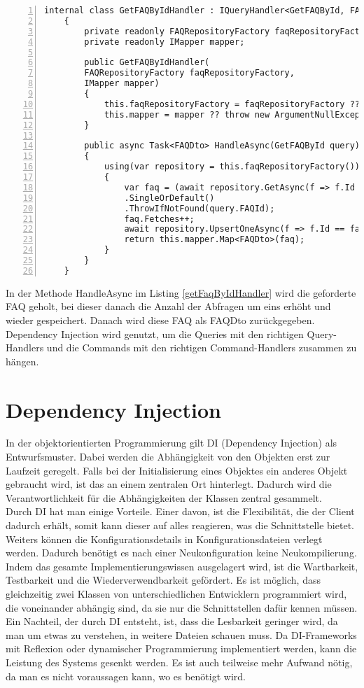 \begin{lstlisting}[caption={CQS-Handler Beispiel},captionpos=b, numbers=left, backgroundcolor=\color{black!10},language={[Sharp]C}, label={getFaqByIdHandler}]
	internal class GetFAQByIdHandler : IQueryHandler<GetFAQById, FAQDto>
	{
		private readonly FAQRepositoryFactory faqRepositoryFactory;
		private readonly IMapper mapper;
		
		public GetFAQByIdHandler(
		FAQRepositoryFactory faqRepositoryFactory,
		IMapper mapper)
		{
			this.faqRepositoryFactory = faqRepositoryFactory ?? throw new ArgumentNullException (nameof(faqRepositoryFactory));
			this.mapper = mapper ?? throw new ArgumentNullException(nameof(mapper));
		}
		
		public async Task<FAQDto> HandleAsync(GetFAQById query)
		{
			using(var repository = this.faqRepositoryFactory())
			{
				var faq = (await repository.GetAsync(f => f.Id == query.FAQId))
				.SingleOrDefault()
				.ThrowIfNotFound(query.FAQId);
				faq.Fetches++;
				await repository.UpsertOneAsync(f => f.Id == faq.Id, faq);
				return this.mapper.Map<FAQDto>(faq);
			}
		}
	}
\end{lstlisting}
In der Methode HandleAsync im Listing \ref{getFaqByIdHandler} wird die geforderte FAQ geholt, bei dieser danach die Anzahl der Abfragen um eins erhöht und wieder gespeichert. Danach wird diese FAQ als FAQDto zurückgegeben.\\
Dependency Injection wird genutzt, um die Queries mit den richtigen Query-Handlers und die Commands mit den richtigen Command-Handlers zusammen zu hängen. \autocite{cqsSOLIDeArchitektur}
\section{Dependency Injection}
In der objektorientierten Programmierung gilt DI (Dependency Injection) als Entwurfsmuster. Dabei werden die Abhängigkeit von den Objekten erst zur Laufzeit geregelt. Falls bei der Initialisierung eines Objektes ein anderes Objekt gebraucht wird, ist das an einem zentralen Ort hinterlegt. Dadurch wird die Verantwortlichkeit für die Abhängigkeiten der Klassen zentral gesammelt.\autocite{wikiDI}\\
Durch DI hat man einige Vorteile. Einer davon, ist die Flexibilität, die der Client dadurch erhält, somit kann dieser auf alles reagieren, was die Schnittstelle bietet. Weiters können die Konfigurationsdetails in Konfigurationsdateien verlegt werden. Dadurch benötigt es nach einer Neukonfiguration keine Neukompilierung. Indem das gesamte Implementierungswissen ausgelagert wird, ist die Wartbarkeit, Testbarkeit und die Wiederverwendbarkeit gefördert. Es ist möglich, dass gleichzeitig zwei Klassen von unterschiedlichen Entwicklern programmiert wird, die voneinander abhängig sind, da sie nur die Schnittstellen dafür kennen müssen.\autocite{wikiDI}\\
Ein Nachteil, der durch DI entsteht, ist, dass die Lesbarkeit geringer wird, da man um etwas zu verstehen, in weitere Dateien schauen muss. Da DI-Frameworks mit Reflexion oder dynamischer Programmierung implementiert werden, kann die Leistung des Systems gesenkt werden. Es ist auch teilweise mehr Aufwand nötig, da man es nicht voraussagen kann, wo es benötigt wird. \autocite{wikiDI}
